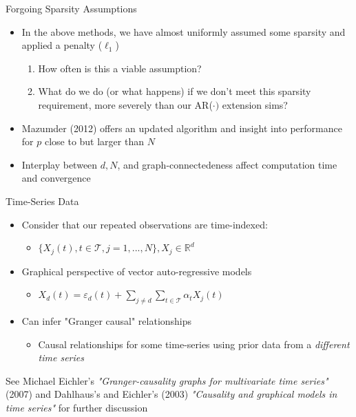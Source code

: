 \documentclass{beamer}
\begin{document}
\begin{frame}{Forgoing Sparsity Assumptions}
\begin{itemize}
\item In the above methods, we have almost uniformly assumed some sparsity and applied a penalty ($\ell_1$)
    \begin{enumerate}
        \item How often is this a viable assumption? 
        \item What do we do (or what happens) if we don't meet this sparsity requirement, more severely than our AR($\cdot)$ extension sims?  
    \end{enumerate}
\item     Mazumder (2012) \cite{mazumder_graphical_2012} offers an updated algorithm and insight into performance for $p$ close to but larger than $N$
\item Interplay between $d, N$, and graph-connectedeness affect computation time and convergence 
\end{itemize}
\end{frame}

\begin{frame}{Time-Series Data}

\begin{itemize} \setlength\itemsep{5mm}

    \item Consider that our repeated observations are time-indexed:
    \begin{itemize} 
        \item  $\{X_j(t), t \in \mathcal{T}, j=1, ..., N\}, X_j \in \mathbb{R}^d$ 
    \end{itemize}

    \item Graphical perspective of vector auto-regressive models
    \begin{itemize}
        \item $X_d(t) = \varepsilon_d(t) + \sum_{j\neq d}\sum_{t\in\mathcal{T}} \alpha_tX_j(t)$
    \end{itemize}


    \item Can infer "Granger causal" relationships
        \begin{itemize}
            \item Causal relationships for some time-series using prior data from a {\it different time series}
        \end{itemize}

\end{itemize}

See Michael Eichler's {\it "Granger-causality graphs for multivariate time series"} (2007) and Dahlhaus's and Eichler's (2003) {\it "Causality and graphical models in time series"} for further discussion  

\end{frame}
\end{document}

